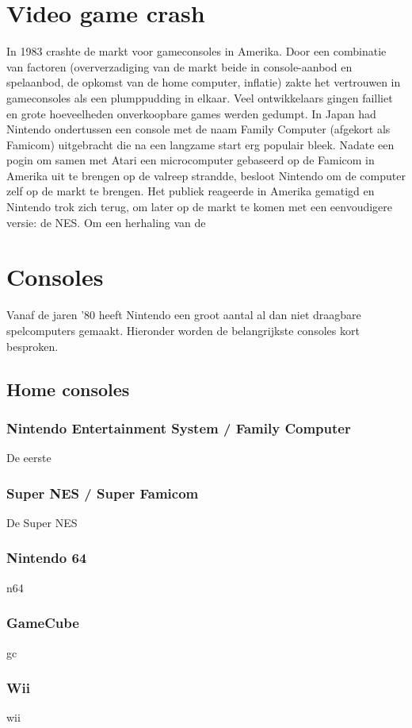 \documentclass{article}
\begin{document}
\section{Video game crash}
In 1983 crashte de markt voor gameconsoles in Amerika. Door een combinatie van factoren (oververzadiging van de markt beide in console-aanbod en spelaanbod, de opkomst van de home computer, inflatie) zakte het vertrouwen in gameconsoles als een plumppudding in elkaar. Veel ontwikkelaars gingen failliet en grote hoeveelheden onverkoopbare games werden gedumpt. In Japan had Nintendo ondertussen een console met de naam Family Computer (afgekort als Famicom) uitgebracht die na een langzame start erg populair bleek. Nadate een pogin om samen met Atari een microcomputer gebaseerd op de Famicom in Amerika uit te brengen op de valreep strandde, besloot Nintendo om de computer zelf op de markt te brengen. Het publiek reageerde in Amerika gematigd en Nintendo trok zich terug, om later op de markt te komen met een eenvoudigere versie: de NES. 
Om een herhaling van de 

\section{Consoles}
Vanaf de jaren '80 heeft Nintendo een groot aantal al dan niet draagbare spelcomputers gemaakt. Hieronder worden de belangrijkste consoles kort besproken. 
\subsection{Home consoles}


\subsubsection{Nintendo Entertainment System / Family Computer}
De eerste 
\subsubsection{Super NES / Super Famicom}
De Super NES
\subsubsection{Nintendo 64}
n64
\subsubsection{GameCube}
gc
\subsubsection{Wii}
wii
\end{document}
